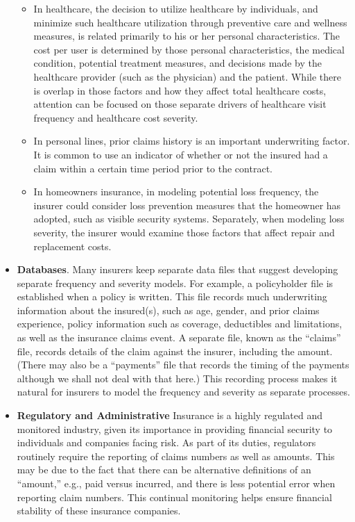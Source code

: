 \documentclass[]{book}
\providecommand{\tightlist}{%
  \setlength{\itemsep}{0pt}\setlength{\parskip}{0pt}}
\theoremstyle{definition}
\theoremstyle{definition}
\theoremstyle{definition}
\theoremstyle{remark}
\begin{document}
\begin{itemize}
  \begin{itemize}
  \tightlist
  \item
    In healthcare, the decision to utilize healthcare by individuals,
    and minimize such healthcare utilization through preventive care and
    wellness measures, is related primarily to his or her personal
    characteristics. The cost per user is determined by those personal
    characteristics, the medical condition, potential treatment
    measures, and decisions made by the healthcare provider (such as the
    physician) and the patient. While there is overlap in those factors
    and how they affect total healthcare costs, attention can be focused
    on those separate drivers of healthcare visit frequency and
    healthcare cost severity.
  \item
    In personal lines, prior claims history is an important underwriting
    factor. It is common to use an indicator of whether or not the
    insured had a claim within a certain time period prior to the
    contract.
  \item
    In homeowners insurance, in modeling potential loss frequency, the
    insurer could consider loss prevention measures that the homeowner
    has adopted, such as visible security systems. Separately, when
    modeling loss severity, the insurer would examine those factors that
    affect repair and replacement costs.
  \end{itemize}
\item
  \textbf{Databases}. Many insurers keep separate data files that
  suggest developing separate frequency and severity models. For
  example, a policyholder file is established when a policy is written.
  This file records much underwriting information about the insured(s),
  such as age, gender, and prior claims experience, policy information
  such as coverage, deductibles and limitations, as well as the
  insurance claims event. A separate file, known as the ``claims'' file,
  records details of the claim against the insurer, including the
  amount. (There may also be a ``payments'' file that records the timing
  of the payments although we shall not deal with that here.) This
  recording process makes it natural for insurers to model the frequency
  and severity as separate processes.
\item
  \textbf{Regulatory and Administrative} Insurance is a highly regulated
  and monitored industry, given its importance in providing financial
  security to individuals and companies facing risk. As part of its
  duties, regulators routinely require the reporting of claims numbers
  as well as amounts. This may be due to the fact that there can be
  alternative definitions of an ``amount,'' e.g., paid versus incurred,
  and there is less potential error when reporting claim numbers. This
  continual monitoring helps ensure financial stability of these
  insurance companies.
\end{itemize}
\end{document}
